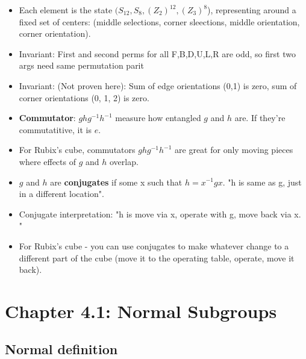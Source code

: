 \documentclass[11pt, oneside]{article}   	%
\begin{document}
\begin{itemize}
\item Each element is the state $(S_{12}, S_8, (Z_2)^{12}, (Z_3)^8$), representing around a fixed set of centers: (middle selections, corner sleections, middle orientation, corner orientation).
\item Invariant: First and second perms for all F,B,D,U,L,R are odd, so first two args need same permutation parit
\item Invariant: (Not proven here): Sum of edge orientations (0,1) is zero, sum of corner orientations (0, 1, 2) is zero.
\item \textbf{Commutator}: $ghg^{-1}h^{-1}$ measure how entangled $g$ and $h$ are.  If they're commutatitive, it is $e$.
\item For Rubix's cube, commutators  $ghg^{-1}h^{-1}$ are great for only moving pieces where effects of $g$ and $h$ overlap.
\item $g$ and $h$ are \textbf{conjugates} if some x such that $h = x^{-1}gx$.   "h is same as g, just in a different location".
\item Conjugate interpretation: "h is move via x, operate with g, move back via x.  "\
\item For Rubix's cube - you can use conjugates to make whatever change to a different part of the cube (move it to the operating table, operate, move it back).
\end{itemize}

\section{Chapter 4.1: Normal Subgroups}

\subsection{Normal definition}
\end{document}
